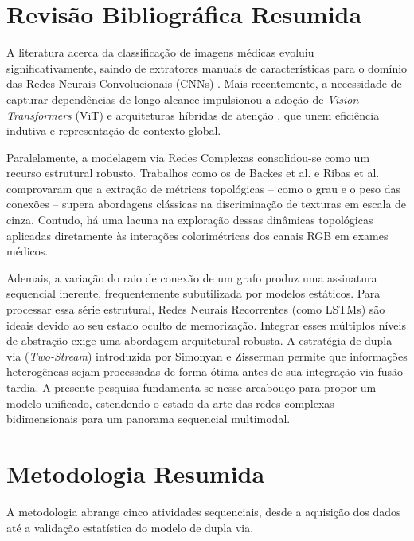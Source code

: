\documentclass[a4paper,12pt]{article}
\begin{document}
\section{Revisão Bibliográfica Resumida}

A literatura acerca da classificação de imagens médicas evoluiu significativamente, saindo de extratores manuais de características para o domínio das Redes Neurais Convolucionais (CNNs) \cite{litjens2017survey}. Mais recentemente, a necessidade de capturar dependências de longo alcance impulsionou a adoção de \textit{Vision Transformers} (ViT) \cite{dosovitskiy2020image} e arquiteturas híbridas de atenção \cite{dai2021coatnet, shamshad2023transformers}, que unem eficiência indutiva e representação de contexto global.

Paralelamente, a modelagem via Redes Complexas consolidou-se como um recurso estrutural robusto. Trabalhos como os de Backes et al. \cite{BACKES2013168} e Ribas et al. \cite{RIBAS2020107189} comprovaram que a extração de métricas topológicas -- como o grau e o peso das conexões -- supera abordagens clássicas na discriminação de texturas em escala de cinza. Contudo, há uma lacuna na exploração dessas dinâmicas topológicas aplicadas diretamente às interações colorimétricas dos canais RGB em exames médicos.

Ademais, a variação do raio de conexão de um grafo produz uma assinatura sequencial inerente, frequentemente subutilizada por modelos estáticos. Para processar essa série estrutural, Redes Neurais Recorrentes (como LSTMs) \cite{hochreiter1997long} são ideais devido ao seu estado oculto de memorização. Integrar esses múltiplos níveis de abstração exige uma abordagem arquitetural robusta. A estratégia de dupla via (\textit{Two-Stream}) introduzida por Simonyan e Zisserman \cite{simonyan2014two} permite que informações heterogêneas sejam processadas de forma ótima antes de sua integração via fusão tardia. A presente pesquisa fundamenta-se nesse arcabouço para propor um modelo unificado, estendendo o estado da arte das redes complexas bidimensionais para um panorama sequencial multimodal.

\section{Metodologia Resumida}

A metodologia abrange cinco atividades sequenciais, desde a aquisição dos dados até a validação estatística do modelo de dupla via.
\end{document}
